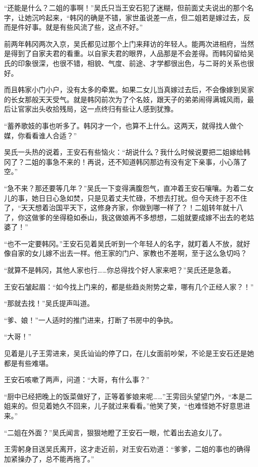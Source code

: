 “还能是什么？二姐的事啊！”吴氏只当王安石犯了迷糊，但前面丈夫说出的那个名字，让她沉吟起来，“韩冈的确是不错，家世虽说差一点，但二姐若是嫁过去，反而是件好事。就是有些风流了些，这点不好。”

前两年韩冈两次入京，吴氏都见过那个上门来拜访的年轻人。能两次进相府，当然是得到了自家夫君的看重。以自家夫君的眼界，人品那是不会差得。而韩冈留给吴氏的印象很深，也很不错，相貌、气度、前途、才学都很出色，与二哥的关系也很好。

而且韩家小门小户，没有太多的牵累。如果二女儿当真嫁过去后，不会像嫁到吴家的长女那般天天受气。就是韩冈前次为了个名妓，跟天子的弟弟闹得满城风雨，最后让官家出头收拾残局，这一点终归有些让人感到犹豫。

“蓄养歌妓的事也听多了。韩冈才一个，也算不上什么。这两天，就得找人做个媒，你看看谁人合适？”

吴氏一头热的说着，王安石有些恼火：“胡说什么？我什么时候说要把二姐嫁给韩冈了？二姐的事急不来的！再说，还不知道韩冈那边有没有定下亲事，小心落了空。”

“急不来？那还要等几年？”吴氏一下变得满腹怨气，直冲着王安石嚷嚷。为着二女儿的事，她日日心急如焚，只是见着丈夫忙碌，不想去打扰。但今天终于忍不住了，“天天想着治国平天下，这修身齐家，你做到哪一样了？！二姐转年就十八了，你这做爹的坐得稳如泰山，我这做娘再不多想想，二姐就要成嫁不出去的老姑婆了！”

“也不一定要韩冈。”王安石见着吴氏听到一个年轻人的名字，就盯着人不放，就好像自家的女儿嫁不出去一样。他王家的门户、家教也不差啊，至于这么急切吗？

“就算不是韩冈，其他人家也行……你总得找个好人家来吧？”吴氏还是急着。

王安石皱起眉：“如今找上门来的，都是些趋炎附势之辈，哪有几个正经人家？！”

“那就去找！”吴氏提声叫道。

“爹、娘！”一人适时的推门进来，打断了书房中的争执。

“大哥！”

见着是儿子王雱进来，吴氏讪讪的停了口，在儿女面前吵架，不论是王安石还是她都是有些难堪。

王安石咳嗽了两声，问道：“大哥，有什么事？”

“厨中已经把晚上的饭菜做好了，正等着爹娘来呢……”王雱回头望望门外，“本是二姐来的。但见着她久不回来，儿子就过来看看。”他笑了笑，“也难怪她不好意思进来。”

“二姐在外面？”吴氏闻言，狠狠地瞪了王安石一眼，忙着出去追女儿了。

王雱躬身目送吴氏离开，这才走近前，对王安石劝道：“爹爹，二姐的事也的确得加紧操办了，总不能再拖了。”

